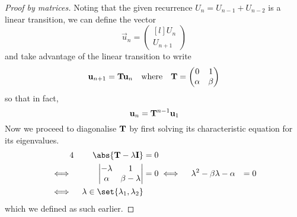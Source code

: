 \begin{proof}[Proof by matrices]
 Noting that the given recurrence \(U_n = U_{n - 1} + U_{n - 2}\) is a linear
 transition, we can define the vector
 \begin{equation*}
  \vec u_n =
   \begin{pmatrix*}[l]
    U_n \\
    U_{n + 1}
   \end{pmatrix*}
 \end{equation*}
 and take advantage of the linear transition to write
 \begin{equation*}
  \mathrm{\mathbf{u}}_{n + 1} = \mathbf{T} \mathrm{\mathbf{u}}_n \quad \text{where} \quad
  \mathbf{T} =
  \begin{pmatrix}
   0 & 1 \\
   \alpha & \beta
  \end{pmatrix}
 \end{equation*}
 so that in fact,
 \begin{equation*}
  \mathrm{\mathbf{u}}_n = \mathbf{T}^{n - 1}\mathrm{\mathbf{u}}_1
 \end{equation*}
 Now we proceed to diagonalise \(\mathbf{T}\) by first solving its
 characteristic equation for its eigenvalues.
 \begin{alignat*}4
  && \abs{\mat T - \lambda \mat I} &= 0 \\
  \iff{}&&
   \begin{vmatrix}
    -\lambda & 1 \\
    \alpha & \beta - \lambda
   \end{vmatrix} &= 0
  \iff{}&& \lambda^2 - \beta \lambda - \alpha &= 0 \\
  \iff{}&& \lambda \in \set{\lambda_1, \lambda_2}
 \end{alignat*}
 which we defined as such earlier.


\end{proof}
